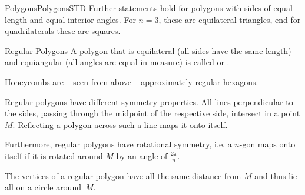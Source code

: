 \begin{MXContent}{Polygons}{Polygons}{STD}
Further statements hold for polygons with sides of equal length and equal 
interior angles. For $n=3$, these are equilateral triangles, end for 
quadrilaterals these are squares.

\begin{MXInfo}{Regular Polygons}
A polygon that is  equilateral (all sides have the same length) and
equiangular (all angles are equal in measure) is called 
 or 
.
\end{MXInfo}

Honeycombs are -- seen from above -- approximately regular hexagons.
\begin{center}
\end{center}

Regular polygons have different symmetry properties. All lines perpendicular to the sides,
passing through the midpoint of the respective side, intersect in a point $M$. Reflecting 
a polygon across such a line maps it onto itself.

Furthermore, regular polygons have rotational symmetry, i.e. a $n$-gon maps onto itself
if it is rotated around $M$ by an angle of $\frac{2 \pi}{n}$.

The vertices of a regular polygon have all the same distance from $M$ and thus lie 
all on a circle around~$M$.
\end{MXContent}


